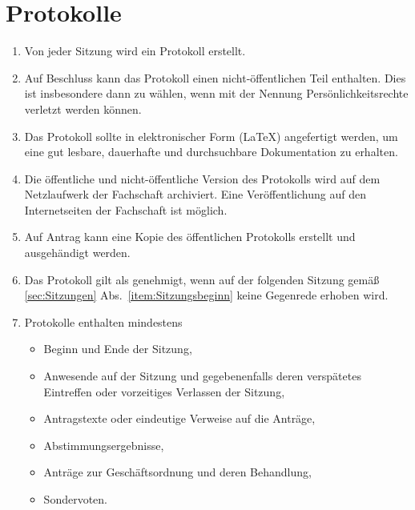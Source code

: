 \section{Protokolle}
\label{sec:protokolle}
\begin{enumerate}
	\item Von jeder Sitzung wird ein Protokoll erstellt.
	\item Auf Beschluss kann das Protokoll einen nicht-öffentlichen Teil enthalten.
	Dies ist insbesondere dann zu wählen, wenn mit der Nennung Persönlichkeitsrechte verletzt werden können.
	\item Das Protokoll sollte in elektronischer Form (\LaTeX) angefertigt werden, um eine gut lesbare, dauerhafte und durchsuchbare Dokumentation zu erhalten.
	\item Die öffentliche und nicht-öffentliche Version des Protokolls wird auf dem Netzlaufwerk der Fachschaft archiviert.
	Eine Veröffentlichung auf den Internetseiten der Fachschaft ist möglich.
	\item Auf Antrag kann eine Kopie des öffentlichen Protokolls erstellt und ausgehändigt werden.
	\item Das Protokoll gilt als genehmigt, wenn auf der folgenden Sitzung gemäß \ref{sec:Sitzungen} Abs.~\ref{item:Sitzungsbeginn} keine Gegenrede erhoben wird.
	\item Protokolle enthalten mindestens
	\begin{itemize}
		\item Beginn und Ende der Sitzung,
		\item Anwesende auf der Sitzung und gegebenenfalls deren verspätetes Eintreffen oder vorzeitiges Verlassen der Sitzung,
		\item Antragstexte oder eindeutige Verweise auf die Anträge,
		\item Abstimmungsergebnisse,
		\item Anträge zur Geschäftsordnung und deren Behandlung,
		\item Sondervoten.
	\end{itemize}
\end{enumerate}


